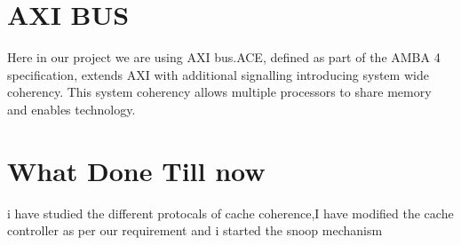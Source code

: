 \documentclass[12pt]{article}
\begin{document}
\section{AXI BUS}
Here in our project we are using AXI bus.ACE, defined as part of the AMBA 4 specification, extends AXI with additional signalling introducing system wide coherency. This system coherency allows multiple processors to share memory and enables technology.
\section{What Done Till now}
i have studied the different protocals of cache coherence,I have modified the cache controller as per our requirement and i started the snoop mechanism 
\begin{figure}[ht]
	
		
\end{figure}
\newpage



\end{document}
